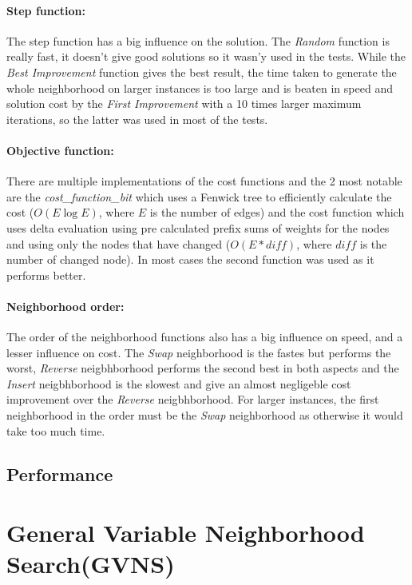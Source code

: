 \documentclass{article}
\begin{document}
\paragraph{Step function:}
The step function has a big influence on the solution. The \textit{Random} function is really fast, it doesn't give good solutions so it wasn'y used in the tests. While the \textit{Best Improvement} function gives the best result, the time taken to generate the whole neighborhood on larger instances is too large and is beaten in speed and solution cost by the \textit{First Improvement} with a 10 times larger maximum iterations, so the latter was used in most of the tests.

\paragraph{Objective function:}
There are multiple implementations of the cost functions and the 2 most notable are the \textit{cost\_function\_bit} which uses a Fenwick tree to efficiently calculate the cost ($O(E \log E)$, where $E$ is the number of edges) and the cost function which uses delta evaluation using pre calculated prefix sums of weights for the nodes and using only the nodes that have changed ($O(E*diff)$, where $diff$ is the number of changed node). In most cases the second function was used as it performs better.

\paragraph{Neighborhood order:}
The order of the neighborhood functions also has a big influence on speed, and a lesser influence on cost. The \textit{Swap} neighborhood is the fastes but performs the worst, \textit{Reverse} neigbhborhood performs the second best in both aspects and the \textit{Insert} neigbhborhood is the slowest and give an almost negligeble cost improvement over the \textit{Reverse} neigbhborhood. For larger instances, the first neighborhood in the order must be the \textit{Swap} neighborhood as otherwise it would take too much time.


\subsection*{Performance}

\section*{General Variable Neighborhood Search(GVNS)}
\end{document}

